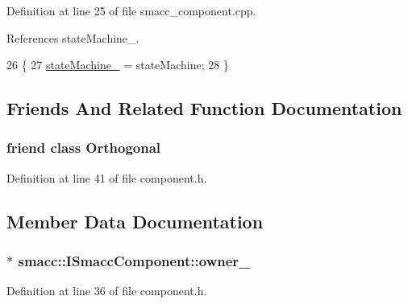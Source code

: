 Definition at line 25 of file smacc\+\_\+component.\+cpp.



References state\+Machine\+\_\+.


\begin{DoxyCode}
26 \{
27     \hyperlink{classsmacc_1_1ISmaccComponent_ae3f37acc1679f79299b86872d4b1f80f}{stateMachine\_} = stateMachine;
28 \}
\end{DoxyCode}


\subsection{Friends And Related Function Documentation}
\subsubsection[{\texorpdfstring{Orthogonal}{Orthogonal}}]{\setlength{\rightskip}{0pt plus 5cm}friend class {\bf Orthogonal}\hspace{0.3cm}{\ttfamily [friend]}}\hypertarget{classsmacc_1_1ISmaccComponent_ab3e0a1388d84ea577a59f487cbfc08e3}{}\label{classsmacc_1_1ISmaccComponent_ab3e0a1388d84ea577a59f487cbfc08e3}


Definition at line 41 of file component.\+h.



\subsection{Member Data Documentation}
\subsubsection[{\texorpdfstring{owner\+\_\+}{owner_}}]{$\ast$ smacc\+::\+I\+Smacc\+Component\+::owner\+\_\+\hspace{0.3cm}{\ttfamily [protected]}}\hypertarget{classsmacc_1_1ISmaccComponent_a8e1a9eacb9208d727756349c19f68abb}{}\label{classsmacc_1_1ISmaccComponent_a8e1a9eacb9208d727756349c19f68abb}


Definition at line 36 of file component.\+h.



